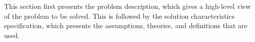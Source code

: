 \documentclass[12pt]{article}
\begin{document}
This section first presents the problem description, which gives a high-level view of the problem to be solved. This is followed by the solution characteristics specification, which presents the assumptions, theories, and definitions that are used.





\end{document}
